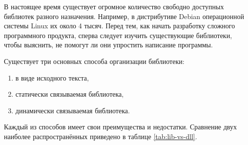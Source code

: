 В настоящее время существует огромное количество свободно доступных
библиотек разного назначения. Например, в дистрибутиве Debian
операционной системы Linux их около 4 тысяч. Перед тем, как начать
разработку сложного программного продукта, сперва следует изучить
существующие библиотеки, чтобы выяснить, не помогут ли они упростить
написание программы.

Существует три основных способа организации библиотеки:
\begin{enumerate}
\item в виде исходного текста,
\item статически связываемая библиотека,
\item динамически связываемая библиотека.
\end{enumerate}

Каждый из способов имеет свои преимущества и недостатки. Сравнение
двух наиболее распространённых приведено в таблице \ref{tab:lib-vs-dll}.

